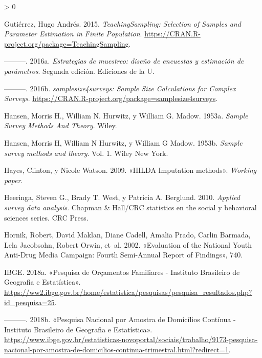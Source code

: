 \documentclass[
  12pt,
  spanish,
]{book}
\newlength{\cslhangindent}
\newenvironment{CSLReferences}[2] %
 {%
  \setlength{\parindent}{0pt}
  \ifodd #1 \everypar{\setlength{\hangindent}{\cslhangindent}}\ignorespaces\fi
  \ifnum #2 > 0
  \setlength{\parskip}{#2\baselineskip}
  \fi
 }%
 {}
\begin{document}
\begin{CSLReferences}{1}{0}
\leavevmode\hypertarget{ref-TS}{}%
Gutiérrez, Hugo Andrés. 2015. \emph{TeachingSampling: Selection of Samples and Parameter Estimation in Finite Population}. \url{https://CRAN.R-project.org/package=TeachingSampling}.

\leavevmode\hypertarget{ref-Gutierrez_2016}{}%
---------. 2016a. \emph{Estrategias de muestreo: diseño de encuestas y estimación de parámetros}. Segunda edición. Ediciones de la U.

\leavevmode\hypertarget{ref-ss4s}{}%
---------. 2016b. \emph{samplesize4surveys: Sample Size Calculations for Complex Surveys}. \url{https://CRAN.R-project.org/package=samplesize4surveys}.

\leavevmode\hypertarget{ref-Hansen_Hurwitz_Madow_1953}{}%
Hansen, Morris H., William N. Hurwitz, y William G. Madow. 1953a. \emph{Sample Survey Methods And Theory}. Wiley.

\leavevmode\hypertarget{ref-hansen1953sample}{}%
Hansen, Morris H, William N Hurwitz, y William G Madow. 1953b. \emph{Sample survey methods and theory}. Vol. 1. Wiley New York.

\leavevmode\hypertarget{ref-Hayes_Watson_2009}{}%
Hayes, Clinton, y Nicole Watson. 2009. {«HILDA Imputation methods»}. \emph{Working paper}.

\leavevmode\hypertarget{ref-Heeringa_West_Berglund_2010}{}%
Heeringa, Steven G., Brady T. West, y Patricia A. Berglund. 2010. \emph{Applied survey data analysis}. Chapman \& Hall/CRC statistics en the social y behavioral sciences series. CRC Press.

\leavevmode\hypertarget{ref-Hornik_Maklan_Cadell_Prado_Barmada_Jacobsohn_Orwin_Sridharan_Zador_Southwell_etal}{}%
Hornik, Robert, David Maklan, Diane Cadell, Amalia Prado, Carlin Barmada, Lela Jacobsohn, Robert Orwin, et~al. 2002. {«Evaluation of the National Youth Anti-Drug Media Campaign: Fourth Semi-Annual Report of Findings»}, 740.

\leavevmode\hypertarget{ref-IBGE-BR2018}{}%
IBGE. 2018a. {«Pesquisa de Orçamentos Familiares - Instituto Brasileiro de Geografia e Estatística»}. \url{https://ww2.ibge.gov.br/home/estatistica/pesquisas/pesquisa_resultados.php?id_pesquisa=25}.

\leavevmode\hypertarget{ref-IBGE-BR_2017}{}%
---------. 2018b. {«Pesquisa Nacional por Amostra de Domicílios Contínua - Instituto Brasileiro de Geografia e Estatística»}. \url{https://www.ibge.gov.br/estatisticas-novoportal/sociais/trabalho/9173-pesquisa-nacional-por-amostra-de-domicilios-continua-trimestral.html?redirect=1}.


\end{CSLReferences}
\end{document}
